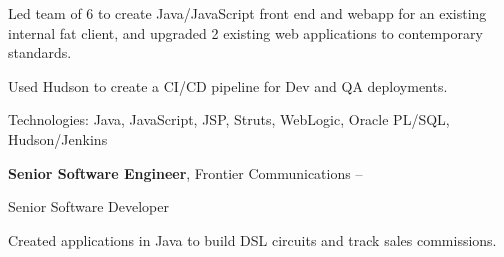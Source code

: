 \documentclass[letterpaper,MMMMyyyy,nonstopmode]{simpleresumecv}
\newcommand{\tech}[1]{\textrm{Technologies:} #1}
\newcommand{\comment}[1]{\ignorespaces} %
\newif\ifLOCATION
\newif\ifLONG
\newif\ifNOTSELECTED
\begin{document}
\begin{Body}

\ifNOTSELECTED
\Entry
\textbf{Lead Software Engineer, Paychex}
\hfill

\begin{Detail}
Led team of 6 to create three public-facing fullstack applications in Java and JavaScript.
\end{Detail}

\ifLONG

\Entry
\href{http://www.paychex.com/}
{\textbf{Paychex}}
\hfill 
\DatestampY{2005} -- \DatestampY{2010}

Lead Developer
\ifLOCATION
\hfill
Rochester, New York
\fi

\begin{Detail}
Led team of 6 to create Java/JavaScript front end and webapp for an existing internal fat client, and upgraded 2 existing web applications to contemporary standards. 

Used Hudson to create a CI/CD pipeline for Dev and QA deployments.

\iffalse
\BulletItem
Member of architecture team to research and set five-year strategy for web application strategy.
\fi

\tech{Java, JavaScript, JSP, Struts, WebLogic, Oracle PL/SQL, Hudson/Jenkins}
\end{Detail}
\fi %

\Entry
\textbf{Senior Software Engineer}, Frontier Communications
\hfill 
 -- 

Senior Software Developer
\ifLOCATION
\hfill
Rochester, New York
\fi

\begin{Detail}
Created applications in Java to build DSL circuits and track sales commissions.


\end{Detail}


\end{Body}
\end{document}
